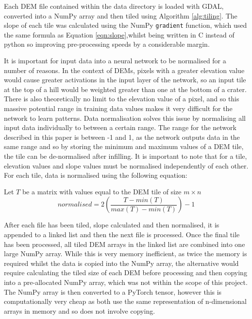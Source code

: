\documentclass[twocolumn]{article}
\begin{document}
Each DEM file contained within the data directory is loaded with GDAL, converted into a NumPy array and then tiled using Algorithm \ref{alg:tiling}.
The slope of each tile was calculated using the NumPy \texttt{gradient} function, which used the same formula as Equation \ref{eqn:slope},whilst being written in C instead of python so improving pre-processing speeds by a considerable margin.

It is important for input data into a neural network to be normalised for a number of reasons.
In the context of DEMs, pixels with a greater elevation value would cause greater activations in the input layer of the network, so an input tile at the top of a hill would be weighted greater than one at the bottom of a crater.
There is also theoretically no limit to the elevation value of a pixel, and so this massive potential range in training data values makes it very difficult for the network to learn patterns.
Data normalisation solves this issue by normalising all input data individually to between a certain range.
The range for the network described in this paper is between -1 and 1, as the network outputs data in the same range and so by storing the minimum and maximum values of a DEM tile, the tile can be de-normalised after infilling.
It is important to note that for a tile, elevation values and slope values must be normalised independently of each other.
For each tile, data is normalised using the following equation:

Let \(T\) be a matrix with values equal to the DEM tile of size \(m \times n\)
\begin{equation}\label{eq:normalise}
normalised = 2\left(\frac{T - min(T)}{max(T) - min(T)}\right) - 1
\end{equation}

After each file has been tiled, slope calculated and then normalised, it is appended to a linked list and then the next file is processed.
Once the final tile has been processed, all tiled DEM arrays in the linked list are combined into one large NumPy array.
While this is very memory inefficient, as twice the memory is required whilst the data is copied into the NumPy array, the alternative would require calculating the tiled size of each DEM before processing and then copying into a pre-allocated NumPy array, which was not within the scope of this project.
The NumPy array is then converted to a PyTorch tensor, however this is computationally very cheap as both use the same representation of n-dimensional arrays in memory and so does not involve copying.
\end{document}

